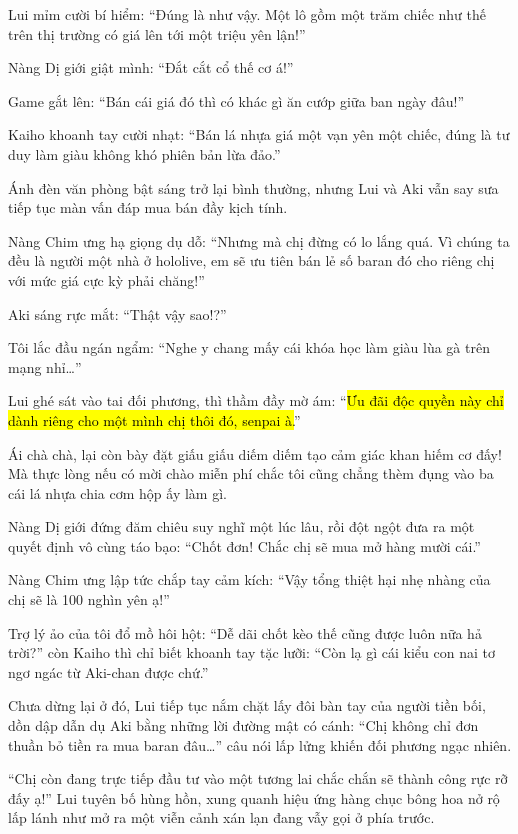 \documentclass[../main.tex]{subfiles}
\begin{document}
Lui mỉm cười bí hiểm: ``Đúng là như vậy. Một lô gồm một trăm chiếc như thế trên thị trường có giá lên tới một triệu yên lận!''

Nàng Dị giới giật mình: ``Đắt cắt cổ thế cơ á!''

Game gắt lên: ``Bán cái giá đó thì có khác gì ăn cướp giữa ban ngày đâu!''

Kaiho khoanh tay cười nhạt: ``Bán lá nhựa giá một vạn yên một chiếc, đúng là tư duy làm giàu không khó phiên bản lừa đảo.''

Ánh đèn văn phòng bật sáng trở lại bình thường, nhưng Lui và Aki vẫn say sưa tiếp tục màn vấn đáp mua bán đầy kịch tính.

Nàng Chim ưng hạ giọng dụ dỗ: ``Nhưng mà chị đừng có lo lắng quá. Vì chúng ta đều là người một nhà ở hololive, em sẽ ưu tiên bán lẻ số baran đó cho riêng chị với mức giá cực kỳ phải chăng!''

Aki sáng rực mắt: ``Thật vậy sao!?''

Tôi lắc đầu ngán ngẩm: ``Nghe y chang mấy cái khóa học làm giàu lùa gà trên mạng nhỉ\dots''

Lui ghé sát vào tai đối phương, thì thầm đầy mờ ám: ``\hl{Ưu đãi độc quyền này chỉ dành riêng cho một mình chị thôi đó, senpai à.}''

Ái chà chà, lại còn bày đặt giấu giấu diếm diếm tạo cảm giác khan hiếm cơ đấy! Mà thực lòng nếu có mời chào miễn phí chắc tôi cũng chẳng thèm đụng vào ba cái lá nhựa chia cơm hộp ấy làm gì.

Nàng Dị giới đứng đăm chiêu suy nghĩ một lúc lâu, rồi đột ngột đưa ra một quyết định vô cùng táo bạo: ``Chốt đơn! Chắc chị sẽ mua mở hàng mười cái.''

Nàng Chim ưng lập tức chắp tay cảm kích: ``Vậy tổng thiệt hại nhẹ nhàng của chị sẽ là 100 nghìn yên ạ!''

Trợ lý ảo của tôi đổ mồ hôi hột: ``Dễ dãi chốt kèo thế cũng được luôn nữa hả trời?'' còn Kaiho thì chỉ biết khoanh tay tặc lưỡi: ``Còn lạ gì cái kiểu con nai tơ ngơ ngác từ Aki-chan được chứ.''

Chưa dừng lại ở đó, Lui tiếp tục nắm chặt lấy đôi bàn tay của người tiền bối, dồn dập dẫn dụ Aki bằng những lời đường mật có cánh: ``Chị không chỉ đơn thuần bỏ tiền ra mua baran đâu\dots'' câu nói lấp lửng khiến đối phương ngạc nhiên.

``Chị còn đang trực tiếp đầu tư vào một tương lai chắc chắn sẽ thành công rực rỡ đấy ạ!'' Lui tuyên bố hùng hồn, xung quanh hiệu ứng hàng chục bông hoa nở rộ lấp lánh như mở ra một viễn cảnh xán lạn đang vẫy gọi ở phía trước.
\end{document}
